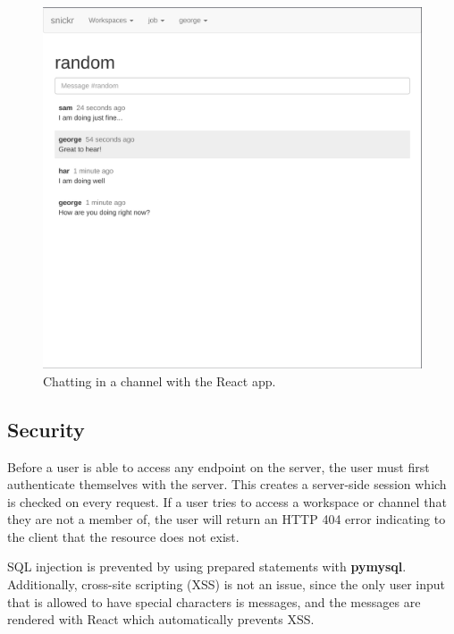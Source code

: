 \documentclass{article}
\begin{document}
\begin{figure}[!ht]
       \centering
       \includegraphics[width=0.9\linewidth]{chatting}
       \caption{Chatting in a channel with the React app.}
       \label{fig:chatting}
\end{figure}

\subsection{Security}
Before a user is able to access any endpoint on the server, the user must first authenticate themselves with the server. This creates a server-side session which is checked on every request. If a user tries to access a workspace or channel that they are not a member of, the user will return an HTTP 404 error indicating to the client that the resource does not exist.

SQL injection is prevented by using prepared statements with \textbf{pymysql}. Additionally, cross-site scripting (XSS) is not an issue, since the only user input that is allowed to have special characters is messages, and the messages are rendered with React which automatically prevents XSS.
\end{document}
